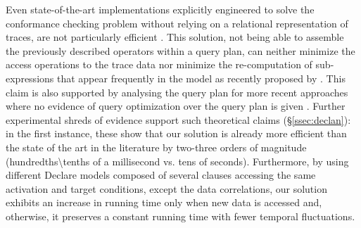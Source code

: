 Even state-of-the-art implementations explicitly engineered to solve the conformance checking problem without relying on a 
relational representation of traces, are not particularly efficient \cite{BurattinMS16}. This solution, not being able to assemble the previously described \LTLf operators within a query plan, can neither minimize the access operations to the trace data nor  minimize the re-computation of sub-expressions that appear frequently in the model as recently proposed by \cite{BellatrecheKB21}. This claim is also supported by analysing the query plan for more recent approaches where no evidence of query optimization over the query plan is given \cite{Polyvyanyy2022,MurillasRA22}. Further experimental shreds of evidence support such theoretical claims (\S\ref{ssec:declan}): in the first instance, these show that our solution is already more efficient than the state of the art in the literature by two{-three} orders of magnitude (hundredths{\textbackslash tenths} of a millisecond vs. tens of seconds). Furthermore, by using different Declare models composed of several clauses accessing the same activation and target conditions, except the data correlations, our solution exhibits an increase in running time only when new data is accessed and, otherwise, it preserves a constant running time with fewer temporal fluctuations.

